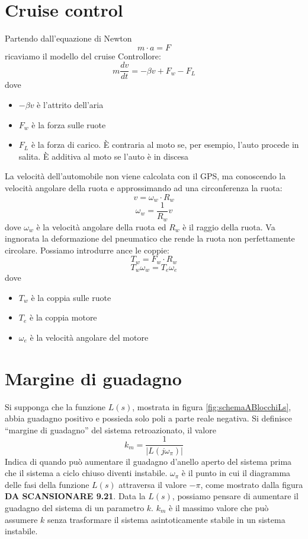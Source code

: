 \documentclass[a4paper]{report}
\newcommand{\bo}{\bfseries }
\begin{document}
\section{Cruise control}
Partendo dall'equazione di Newton
\[
m \cdot a = F
\]
ricaviamo il modello del cruise Controllore:
\[
m \dfrac{dv}{dt} = - \beta v + F_w - F_L
\]
dove
\begin{itemize}
\item $- \beta v$ \`e l'attrito dell'aria
\item $F_w$ \`e la forza sulle ruote
\item $F_L$ \`e la forza di carico. \`E contraria al moto se, per
  esempio, l'auto procede in salita. \`E additiva al moto se l'auto
  \`e in discesa
\end{itemize}
La velocit\`a dell'automobile non viene calcolata con il GPS, ma
conoscendo la velocit\`a angolare della ruota e approssimando ad una
circonferenza la ruota:
\[
v = \omega_w \cdot R_w
\]
\[
\omega_w = \dfrac{1}{R_w} v
\]
dove $\omega_w$ \`e la velocit\`a angolare della ruota ed $R_w$ \`e il
raggio della ruota. Va ingnorata la deformazione del pneumatico che
rende la ruota non perfettamente circolare. Possiamo introdurre ance
le coppie:
\[
T_w = F_w \cdot R_w
\]
\[
T_w \omega_w = T_e \omega_e
\]
dove
\begin{itemize}
\item $T_w$ \`e la coppia sulle ruote
\item $T_e$ \`e la coppia motore
\item $\omega_e$ \`e la velocit\`a angolare del motore
\end{itemize}

\section{Margine di guadagno}

Si supponga che la funzione $L(s)$, mostrata in figura
\ref{fig:schemaABlocchiLs}, abbia guadagno positivo e possieda solo
poli a parte reale negativa. Si definisce ``margine di guadagno'' del
sistema retroazionato, il valore
\[
k_m = \dfrac{1}{|L(j \omega_\pi)|}
\]
Indica di quando pu\`o aumentare il guadagno d'anello aperto del sistema
prima che il sistema a ciclo chiuso diventi instabile.
$\omega_{\pi}$ \`e il punto in cui il diagramma delle fasi della funzione
$L(s)$ attraversa il valore $-\pi$, come mostrato dalla figura {\bo DA
  SCANSIONARE 9.21}. Data la $L(s)$, possiamo pensare di aumentare il
guadagno del sistema di un parametro $k$. $k_m$ \`e il massimo valore
che pu\`o assumere $k$ senza trasformare il sistema asintoticamente
stabile in un sistema instabile.
\end{document}
